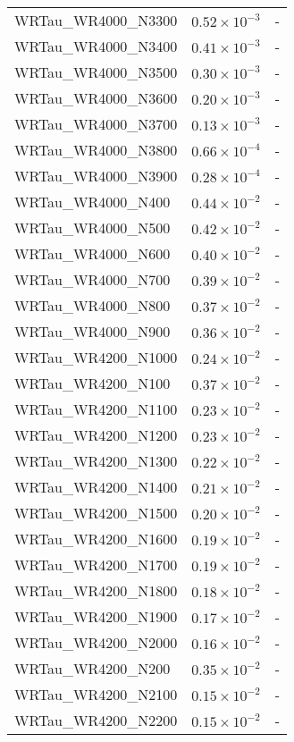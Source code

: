 \begin{longtable}[c]{| C{.35\textwidth} | C{.15\textwidth} | C{.1\textwidth}|}
    WRTau\_WR4000\_N3300 & $0.52\times10^{-3}$ & - \\
    WRTau\_WR4000\_N3400 & $0.41\times10^{-3}$ & - \\
    WRTau\_WR4000\_N3500 & $0.30\times10^{-3}$ & - \\
    WRTau\_WR4000\_N3600 & $0.20\times10^{-3}$ & - \\
    WRTau\_WR4000\_N3700 & $0.13\times10^{-3}$ & - \\
    WRTau\_WR4000\_N3800 & $0.66\times10^{-4}$ & - \\
    WRTau\_WR4000\_N3900 & $0.28\times10^{-4}$ & - \\
    WRTau\_WR4000\_N400 & $0.44\times10^{-2}$ & - \\
    WRTau\_WR4000\_N500 & $0.42\times10^{-2}$ & - \\
    WRTau\_WR4000\_N600 & $0.40\times10^{-2}$ & - \\
    WRTau\_WR4000\_N700 & $0.39\times10^{-2}$ & - \\
    WRTau\_WR4000\_N800 & $0.37\times10^{-2}$ & - \\
    WRTau\_WR4000\_N900 & $0.36\times10^{-2}$ & - \\
    WRTau\_WR4200\_N1000 & $0.24\times10^{-2}$ & - \\
    WRTau\_WR4200\_N100 & $0.37\times10^{-2}$ & - \\
    WRTau\_WR4200\_N1100 & $0.23\times10^{-2}$ & - \\
    WRTau\_WR4200\_N1200 & $0.23\times10^{-2}$ & - \\
    WRTau\_WR4200\_N1300 & $0.22\times10^{-2}$ & - \\
    WRTau\_WR4200\_N1400 & $0.21\times10^{-2}$ & - \\
    WRTau\_WR4200\_N1500 & $0.20\times10^{-2}$ & - \\
    WRTau\_WR4200\_N1600 & $0.19\times10^{-2}$ & - \\
    WRTau\_WR4200\_N1700 & $0.19\times10^{-2}$ & - \\
    WRTau\_WR4200\_N1800 & $0.18\times10^{-2}$ & - \\
    WRTau\_WR4200\_N1900 & $0.17\times10^{-2}$ & - \\
    WRTau\_WR4200\_N2000 & $0.16\times10^{-2}$ & - \\
    WRTau\_WR4200\_N200 & $0.35\times10^{-2}$ & - \\
    WRTau\_WR4200\_N2100 & $0.15\times10^{-2}$ & - \\
    WRTau\_WR4200\_N2200 & $0.15\times10^{-2}$ & - \\

\end{longtable}
